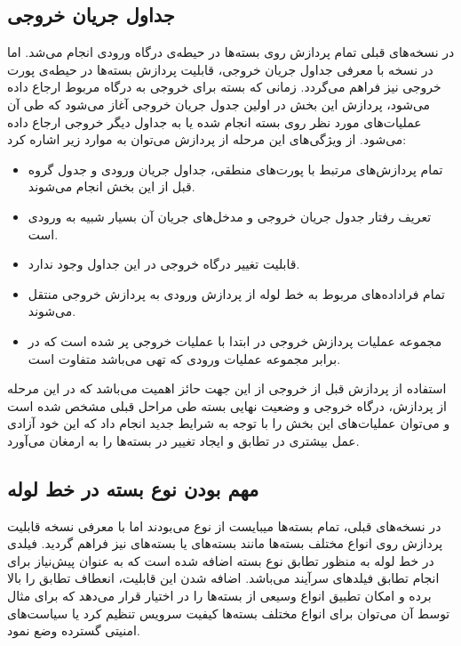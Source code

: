 \subsection{جداول جریان خروجی}
در نسخه‌های قبلی تمام پردازش روی بسته‌ها در حیطه‌ی درگاه ورودی انجام می‌شد. اما در نسخه  با معرفی جداول جریان خروجی، قابلیت پردازش بسته‌ها در حیطه‌ی پورت خروجی نیز فراهم می‌گردد. زمانی که بسته برای خروجی به درگاه مربوط ارجاع داده می‌شود، پردازش این بخش در اولین جدول جریان خروجی آغاز می‌شود که طی آن عملیات‌های مورد نظر روی بسته انجام شده یا به جداول دیگر خروجی ارجاع داده می‌شود. از ویژگی‌های این مرحله از پردازش می‌توان به موارد زیر اشاره کرد:
\begin{itemize}
	\item
تمام پردازش‌های مرتبط با پورت‌های منطقی، جداول جریان ورودی و جدول گروه قبل از این بخش انجام می‌شوند.
	\item
تعریف رفتار جدول جریان خروجی و مدخل‌های جریان آن بسیار شبیه به ورودی است.
	\item
قابلیت تغییر درگاه خروجی در این جداول وجود ندارد.
	\item
تمام فراداده‌های مربوط به خط لوله از پردازش  ورودی به پردازش خروجی منتقل می‌شوند.
	\item
مجموعه عملیات پردازش خروجی در ابتدا با عملیات خروجی پر شده است که در برابر مجموعه عملیات ورودی  که تهی می‌باشد متفاوت است.
\end{itemize}
استفاده از پردازش قبل از خروجی از این جهت حائز اهمیت می‌باشد که در این مرحله از پردازش، درگاه خروجی و وضعیت نهایی بسته طی مراحل قبلی مشخص شده است و می‌توان عملیات‌های این بخش را با توجه به شرایط جدید انجام داد که این خود آزادی عمل بیشتری در تطابق و ایجاد تغییر در بسته‌ها را به ارمغان می‌آورد.

\subsection{مهم بودن نوع بسته در خط لوله}
در نسخه‌های قبلی، تمام بسته‌ها میبایست از نوع  می‌بودند اما با معرفی نسخه  قابلیت پردازش روی انواع مختلف بسته‌ها مانند بسته‌های  یا بسته‌های  نیز فراهم گردید. فیلدی در خط لوله به منظور تطابق نوع بسته اضافه شده است که به عنوان پیش‌نیاز برای انجام تطابق فیلد‌های سرآیند می‌باشد. اضافه شدن این قابلیت، انعطاف تطابق را بالا برده و امکان تطبیق انواع وسیعی از بسته‌ها را در اختیار قرار می‌دهد که برای مثال توسط آن می‌توان برای انواع مختلف بسته‌ها کیفیت سرویس تنظیم کرد یا سیاست‌های امنیتی گسترده وضع نمود.

\pagebreak

